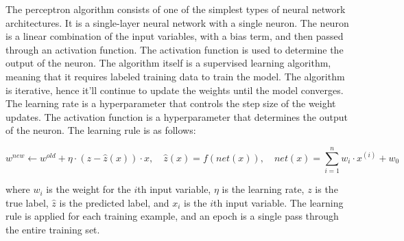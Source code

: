 \documentclass[12pt]{article}
\begin{document}
The perceptron algorithm consists of one of the simplest types of neural
network architectures. It is a single-layer neural network with a single
neuron. The neuron is a linear combination of the input variables, with a
bias term, and then passed through an activation function. The activation
function is used to determine the output of the neuron.
The algorithm itself is a supervised learning algorithm, meaning that it
requires labeled training data to train the model. The algorithm is
iterative, hence it'll continue to update the weights until the
model converges. The learning rate is a hyperparameter that controls the
step size of the weight updates. The activation function is a hyperparameter
that determines the output of the neuron. The learning rule is as follows:

\begin{equation*}
  w^{new} \leftarrow w^{old} + \eta \cdot (z - \hat{z}(x)) \cdot x, \quad
  \hat{z}(x) = f(net(x)), \quad
  net(x) = \sum_{i=1}^n w_i \cdot x^{(i)} + w_0
\end{equation*}

where $w_i$ is the weight for the $i$th input variable, $\eta$ is the
learning rate, $z$ is the true label, $\hat{z}$ is the predicted label,
and $x_i$ is the $i$th input variable. The learning rule is applied for
each training example, and an epoch is a single pass through the entire
training set.
\end{document}

